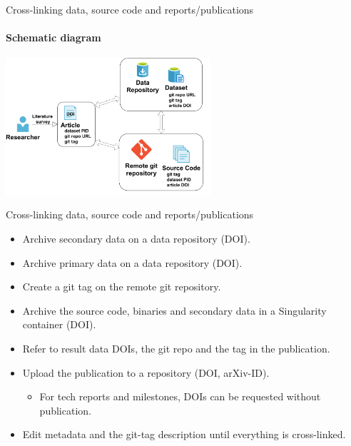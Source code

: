 \documentclass[
	ngerman,%
	aspectratio=169,%
	color={accentcolor=2d},
	logo=true,%
	colorframetitle=true,%
	]{tudabeamer}
\begin{document}



\begin{frame}{Cross-linking data, source code and reports/publications} 
	\framesubtitle{Schematic diagram}
	
	\begin{center}
		\includegraphics[width=0.57\textwidth]{figures/cross-linking.pdf}
	\end{center}

\end{frame}

\begin{frame}{Cross-linking data, source code and reports/publications} 
	
	\vfill
	\begin{itemize}
		\item Archive secondary data on a data repository (DOI). 
		\item Archive primary data on a data repository (DOI). 
		\item Create a git tag on the remote git repository. 
		\item Archive the source code, binaries and secondary data in a Singularity container (DOI). 
		\item Refer to result data DOIs, the git repo and the tag in the publication.
		\item Upload the publication to a repository (DOI, arXiv-ID).
			\begin{itemize}
				\item For tech reports and milestones, DOIs can be requested without publication.
			\end{itemize}
		\item Edit metadata and the git-tag description until everything is cross-linked.
	\end{itemize}

\end{frame}
\end{document}
